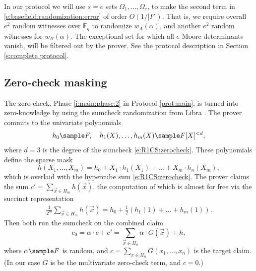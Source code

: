 In our protocol we will use $s = e$ sets $\Omega_1,\ldots, \Omega_e$, to make the second term in \eqref{e:basefield:randomization:error} of order $O(1/|F|)$. 
That is,  we require overall $e^2$ random witnesses over $\mathbb F_q$ to randomize $w_A(\alpha)$, and another $e^2$ random witnesses for $w_B(\alpha)$. 
The exceptional set for which all $e$ Moore determinants vanish, will be filtered out by the prover.
See the protocol description in Section \ref{s:complete protocol}.


\subsection{Zero-check masking}
\label{s:zk:zerocheck}

The zero-check, Phase \ref{i:main:phase:2} in Protocol \ref{prot:main}, is turned into zero-knowledge by using the sumcheck randomization from Libra \cite{cryptoeprint:2019/317}.
The prover commits to the univariate polynomials 
\begin{equation}
\label{e:zk:zerocheck:randomizers}
h_0\sample F, \quad h_1(X),\ldots, h_m(X)\sample F[X]^{<d},
\end{equation}
where $d=3$ is the degree of the sumcheck \eqref{e:R1CS:zerocheck}.
These polynomials define the sparse mask
\begin{equation}
\label{e:zk:zerocheck:sparse:mask}
h(X_1,\ldots, X_m) = h_0 + X_1\cdot h_1(X_1) + \ldots + X_m\cdot h_n(X_m),
\end{equation}
which is overlaid with the hypercube sum \eqref{e:R1CS:zerocheck}. 
The prover claims the sum $c' = \sum_{\vec x \in H_m} h(\vec x)$, the computation of which is almost for free via the succinct representation
\begin{align*}
\frac{1}{2^m}\sum_{\vec x\in H_m} h(\vec x) 
=  h_0 + \frac{1}{2}\left(
h_1(1) + \ldots + h_m(1)
\right).
\end{align*}
Then both run the sumcheck on the combined claim
\begin{equation}
\label{e:zk:zerocheck:combined:claim}
c_0 = \alpha \cdot c + c' = \sum_{\vec x\in H_n} \alpha\cdot G(\vec x) + h,
\end{equation}
where $\alpha\sample F$ is random, and  $c = \sum_{x\in H_n} G(x_1,\ldots, x_n)$ is the target claim. 
(In our case $G$ is be the multivariate zero-check term, and $c=0$.)

